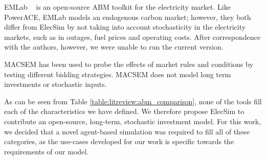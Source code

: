 EMLab ~\cite{Chappin2017} is an open-source ABM toolkit for the electricity market. Like PowerACE, EMLab models an endogenous carbon market; however, they both differ from ElecSim by not taking into account stochasticity in the electricity markets, such as in outages, fuel prices and operating costs. After correspondence with the authors, however, we were unable to run the current version.

MACSEM \cite{Praca2003} has been used to probe the effects of market rules and conditions by testing different bidding strategies. MACSEM does not model long term investments or stochastic inputs.


As can be seen from Table \ref{table:litreview:abm_comparison}, none of the tools fill each of the characteristics we have defined. We therefore propose ElecSim to contribute an open-source, long-term, stochastic investment model. For this work, we decided that a novel agent-based simulation was required to fill all of these categories, as the use-cases developed for our work is specific towards the requirements of our model.

